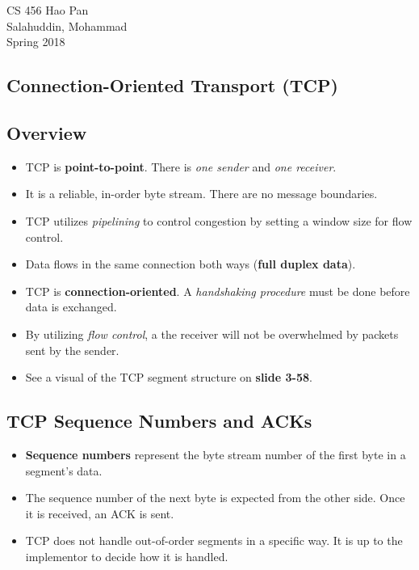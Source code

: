 \documentclass{article}
\begin{document}
\noindent
{CS 456 \hfill Hao Pan}\\
{Salahuddin, Mohammad}\\
{Spring 2018}


\begin{center}
\section{Connection-Oriented Transport (TCP)}
\noindent
\end{center}

\subsection{Overview}

\begin{itemize}
\item TCP is {\bf point-to-point}. There is \emph{one sender} and \emph{one receiver}.
\item It is a reliable, in-order byte stream. There are no message boundaries.
\item TCP utilizes \emph{pipelining} to control congestion by setting a window size for flow control.
\item Data flows in the same connection both ways ({\bf full duplex data}).
\item TCP is {\bf connection-oriented}. A \emph{handshaking procedure} must be done before data is exchanged.
\item By utilizing \emph{flow control}, a the receiver will not be overwhelmed by packets sent by the sender.
\item See a visual of the TCP segment structure on {\bf slide 3-58}.
\end{itemize}

\subsection{TCP Sequence Numbers and ACKs}

\begin{itemize}
\item {\bf Sequence numbers} represent the byte stream number of the first byte in a segment's data.
\item The sequence number of the next byte is expected from the other side. Once it is received, an ACK is sent.
\item TCP does not handle out-of-order segments in a specific way. It is up to the implementor to decide how it is handled.
\end{itemize}
\end{document}
